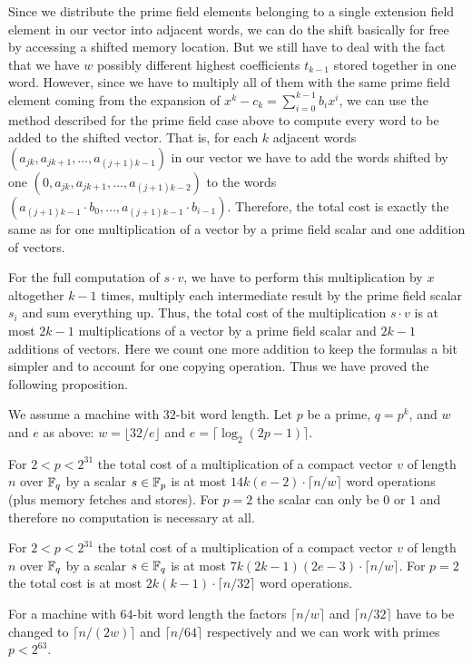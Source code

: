 Since we distribute the prime field elements belonging to a single
extension field element in our vector into adjacent words, we can 
do the shift basically for free by accessing a shifted memory location.
But we still have to deal with the fact that we have $w$ possibly different
highest coefficients $t_{k-1}$ stored together in one word. However,
since we have to multiply all of them with the same prime field element
coming from the expansion of $x^k - c_k = \sum_{i=0}^{k-1} b_i x^i$,
we can use the method described
for the prime field case above to compute every word to be added to the
shifted vector. That is, for each $k$ adjacent words 
$(a_{jk},a_{jk+1},\ldots,a_{(j+1)k-1})$ in our vector we have to
add the words shifted by one $(0,a_{jk},a_{jk+1},\ldots,a_{(j+1)k-2})$
to the words $(a_{(j+1)k-1} \cdot b_0, \ldots, a_{(j+1)k-1} \cdot b_{i-1})$.
Therefore, the total cost is exactly the same as for one multiplication of
a vector by a prime field scalar and one addition of vectors.

For the full computation of $s \cdot v$, we have to perform this multiplication
by $x$ altogether $k-1$ times, multiply each intermediate result by the
prime field scalar $s_i$ and sum everything up. Thus, the total cost
of the multiplication $s \cdot v$ is at most $2k-1$ multiplications
of a vector by a prime field scalar and $2k-1$ additions of vectors.
Here we count one more addition to keep the formulas a bit simpler
and to account for one copying operation.
Thus we have proved the following proposition.

\begin{Prop}
\label{multvec}
We assume a machine with $32$-bit word length.
Let $p$ be a prime, $q = p^k$, and $w$ and $e$ as above:
$w = \lfloor 32/e \rfloor$ and $e = \lceil \log_2(2p-1) \rceil$.

For\/ $2 < p < 2^{31}$ the total cost of a multiplication of a compact 
vector $v$ of length $n$ over $\mathbb{F}_q$ by a scalar $s \in \mathbb{F}_p$ is at most 
$14k(e-2)\cdot \lceil n/w \rceil$ word operations (plus memory fetches
and stores). For $p=2$ the scalar
can only be $0$ or $1$ and therefore no computation is necessary at all.

For\/ $2 < p < 2^{31}$ the total cost of a multiplication of a compact
vector $v$ of length $n$ over $\mathbb{F}_q$ by a scalar $s \in \mathbb{F}_q$ is at most
$7k(2k-1)(2e-3)\cdot \lceil n/w \rceil$. For $p = 2$ the total cost is
at most $2k(k-1) \cdot \lceil n/32 \rceil$ word operations.

For a machine with $64$-bit word length the factors $\lceil n/w \rceil$
and $\lceil n/32 \rceil$ have to be changed to $\lceil n/(2w) \rceil$
and $\lceil n/64 \rceil$ respectively
and we can work with primes $p < 2^{63}$.
\end{Prop}

